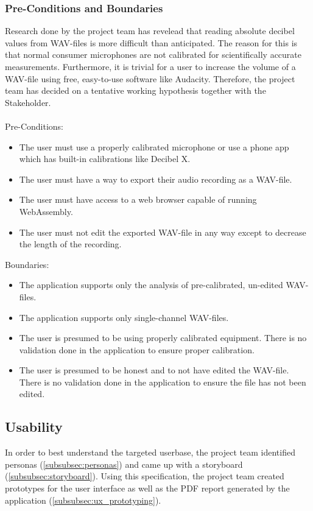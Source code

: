 \subsubsection{Pre-Conditions and Boundaries}
Research done by the project team has revelead that reading absolute decibel values from WAV-files is more difficult than anticipated.
The reason for this is that normal consumer microphones are not calibrated for scientifically accurate measurements\cite{stackoverflow_spl}. Furthermore, it is trivial for a user
to increase the volume of a WAV-file using free, easy-to-use software like Audacity\cite{audacity}\cite{audacity_amplify}. Therefore, the project team has decided 
on a tentative working hypothesis together with the Stakeholder. \\ \\
Pre-Conditions:
\begin{itemize}
    \item The user must use a properly calibrated microphone or use a phone app which has built-in calibrations like Decibel X\cite{decibelx_ios}\cite{decibelx_android}.
    \item The user must have a way to export their audio recording as a WAV-file.
    \item The user must have access to a web browser capable of running WebAssembly.
    \item The user must not edit the exported WAV-file in any way except to decrease the length of the recording.
\end{itemize}
Boundaries:
\begin{itemize}
    \item The application supports only the analysis of pre-calibrated, un-edited WAV-files.
    \item The application supports only single-channel WAV-files.
    \item The user is presumed to be using properly calibrated equipment. There is no validation done in the application to ensure proper calibration.
    \item The user is presumed to be honest and to not have edited the WAV-file. There is no validation done in the application to ensure the file has not been edited.
\end{itemize}

\subsection{Usability}
In order to best understand the targeted userbase, the project team identified personas (\ref{subsubsec:personas}) and came up with a storyboard (\ref{subsubsec:storyboard}).
Using this specification, the project team created prototypes for the user interface as well as the PDF report generated by the application (\ref{subsubsec:ux_prototyping}).

